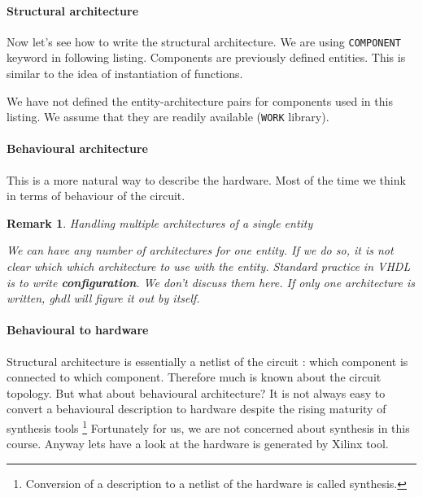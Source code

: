 \documentclass[a4paper,10pt]{article}
\newtheorem{remark}{Remark}
\begin{document}
\paragraph{Structural architecture} Now let's see how to write the structural
architecture. We are using \texttt{COMPONENT} keyword in following listing.
Components are previously defined entities. This is similar to the idea of
instantiation of functions. 

We have not defined the entity-architecture pairs for components used in this
listing. We assume that they are readily available (\texttt{WORK} library).

  

  \paragraph{Behavioural architecture}

  This is a more natural way to describe the hardware. Most of the time we think
  in terms of behaviour of the circuit. 
 
  


  \begin{remark}{Handling multiple architectures of a single entity}
    
    We can have any number of architectures for one entity. If we do so, it is
    not clear which which architecture to use with the entity. Standard practice
    in VHDL is to write \textbf{configuration}. We don't discuss them here. If
    only one architecture is written, ghdl will figure it out by itself.
 
  \end{remark}

  \paragraph{Behavioural to hardware}
    
  Structural architecture is essentially a netlist of the circuit : which
  component is connected to which component. Therefore much is known about the
  circuit topology. But what about behavioural architecture? It is not always
  easy to convert a behavioural description to hardware despite the rising
  maturity of synthesis tools \footnote{Conversion of a description to a netlist
  of the hardware is called synthesis.} Fortunately for us, we are not concerned
  about synthesis in this course.  Anyway lets have a look at the hardware is
  generated by Xilinx tool.
\end{document}

